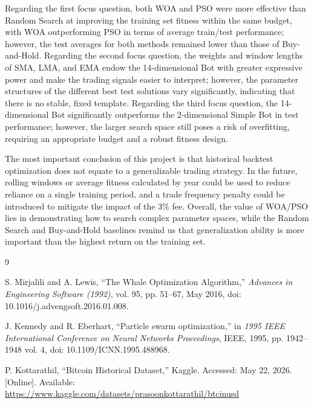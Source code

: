 \documentclass[11pt,a4paper]{article}
\begin{document}
Regarding the first focus question, both WOA and PSO were more effective than Random Search at improving the training set fitness within the same budget, with WOA outperforming PSO in terms of average train/test performance; however, the test averages for both methods remained lower than those of Buy-and-Hold. Regarding the second focus question, the weights and window lengths of SMA, LMA, and EMA endow the 14-dimensional Bot with greater expressive power and make the trading signals easier to interpret; however, the parameter structures of the different best test solutions vary significantly, indicating that there is no stable, fixed template. Regarding the third focus question, the 14-dimensional Bot significantly outperforms the 2-dimensional Simple Bot in test performance; however, the larger search space still poses a risk of overfitting, requiring an appropriate budget and a robust fitness design.

The most important conclusion of this project is that historical backtest optimization does not equate to a generalizable trading strategy. In the future, rolling windows or average fitness calculated by year could be used to reduce reliance on a single training period, and a trade frequency penalty could be introduced to mitigate the impact of the 3\% fee. Overall, the value of WOA/PSO lies in demonstrating how to search complex parameter spaces, while the Random Search and Buy-and-Hold baselines remind us that generalization ability is more important than the highest return on the training set.

\begin{thebibliography}{9}
    
S. Mirjalili and A. Lewis, ``The Whale Optimization Algorithm,'' \textit{Advances in Engineering Software (1992)}, vol. 95, pp. 51--67, May 2016, doi: 10.1016/j.advengsoft.2016.01.008.

J. Kennedy and R. Eberhart, ``Particle swarm optimization,'' in \textit{1995 IEEE International Conference on Neural Networks Proceedings}, IEEE, 1995, pp. 1942--1948 vol. 4, doi: 10.1109/ICNN.1995.488968.

P. Kottarathil, ``Bitcoin Historical Dataset,'' Kaggle. Accessed: May 22, 2026. [Online]. Available: \url{https://www.kaggle.com/datasets/prasoonkottarathil/btcinusd}

\end{thebibliography}
\end{document}
